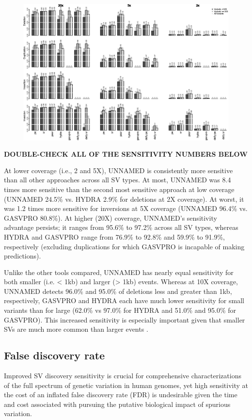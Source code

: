 \documentclass[11pt]{article}
\begin{document}
\begin{figure}
\includegraphics[width=6.5in]{fig1.eps}
\end{figure}

\textbf{DOUBLE-CHECK ALL OF THE SENSITIVITY NUMBERS BELOW}

At lower coverage (i.e., 2 and 5X), UNNAMED is consistently more sensitive 
than all other approaches across all SV types. At most, UNNAMED was 
8.4 times more sensitive than the second most
sensitive approach at low coverage (UNNAMED 24.5\% vs. HYDRA 2.9\% for deletions
at 2X coverage). At worst, it was 1.2 times more sensitive for inversions at
5X coverage (UNNAMED 96.4\% vs. GASVPRO 80.8\%). At higher (20X) coverage, 
UNNAMED's sensitivity advantage persists; it ranges from 95.6\% to 97.2\% 
across all SV types, whereas HYDRA and GASVPRO range from 76.9\% to 92.8\% and
59.9\% to 91.9\%, respectively (excluding duplications for which GASVPRO is
incapable of making predictions).

Unlike the other tools compared, UNNAMED has nearly equal sensitivity for 
both smaller (i.e. < 1kb) and larger (> 1kb) events. Whereas at 10X coverage,
UNNAMED detects 96.0\% and 95.0\% of deletions less and greater than 1kb, 
respectively, GASVPRO and HYDRA each have much lower sensitivity for small
variants than for large (62.0\% vs 97.0\% for HYDRA and 51.0\% and 95.0\% for
GASVPRO). This increased sensitivity is especially important given that smaller
SVs are much more common than larger events \cite{mills2011}.


\subsection{False discovery rate}
Improved SV discovery sensitivity is crucial for comprehensive characterizations
of the full spectrum of genetic variation in human genomes, yet high
sensitivity at the cost of an inflated false discovery rate (FDR) is
undesirable given the time and cost associated with pursuing the putative 
biological impact of spurious variation.
\end{document}
